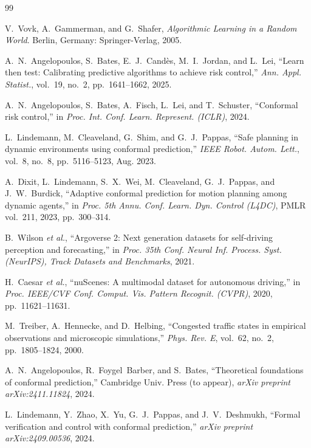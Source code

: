 \documentclass[lettersize,journal]{IEEEtran}
\begin{document}
\begin{thebibliography}{99}

V.~Vovk, A.~Gammerman, and G.~Shafer, \emph{Algorithmic Learning in a
Random World}. Berlin, Germany: Springer-Verlag, 2005.

A.~N.~Angelopoulos, S.~Bates, E.~J.~Cand\`es, M.~I.~Jordan, and L.~Lei,
``Learn then test: Calibrating predictive algorithms to achieve risk
control,'' \emph{Ann. Appl. Statist.}, vol.~19, no.~2, pp.~1641--1662,
2025.

A.~N.~Angelopoulos, S.~Bates, A.~Fisch, L.~Lei, and T.~Schuster,
``Conformal risk control,'' in \emph{Proc. Int. Conf. Learn.
Represent. (ICLR)}, 2024.

L.~Lindemann, M.~Cleaveland, G.~Shim, and G.~J.~Pappas, ``Safe planning
in dynamic environments using conformal prediction,'' \emph{IEEE Robot.
Autom. Lett.}, vol.~8, no.~8, pp.~5116--5123, Aug. 2023.

A.~Dixit, L.~Lindemann, S.~X.~Wei, M.~Cleaveland, G.~J.~Pappas, and
J.~W.~Burdick, ``Adaptive conformal prediction for motion planning
among dynamic agents,'' in \emph{Proc. 5th Annu. Conf. Learn. Dyn.
Control (L4DC)}, PMLR vol.~211, 2023, pp.~300--314.

B.~Wilson \emph{et al.}, ``Argoverse 2: Next generation datasets for
self-driving perception and forecasting,'' in \emph{Proc. 35th Conf.
Neural Inf. Process. Syst. (NeurIPS), Track Datasets and Benchmarks},
2021.

H.~Caesar \emph{et al.}, ``nuScenes: A multimodal dataset for autonomous
driving,'' in \emph{Proc. IEEE/CVF Conf. Comput. Vis. Pattern Recognit.
(CVPR)}, 2020, pp.~11621--11631.

M.~Treiber, A.~Hennecke, and D.~Helbing, ``Congested traffic states in
empirical observations and microscopic simulations,'' \emph{Phys. Rev.
E}, vol.~62, no.~2, pp.~1805--1824, 2000.

A.~N.~Angelopoulos, R.~Foygel~Barber, and S.~Bates, ``Theoretical
foundations of conformal prediction,'' Cambridge Univ. Press (to appear),
\emph{arXiv preprint arXiv:2411.11824}, 2024.

L.~Lindemann, Y.~Zhao, X.~Yu, G.~J.~Pappas, and J.~V.~Deshmukh,
``Formal verification and control with conformal prediction,''
\emph{arXiv preprint arXiv:2409.00536}, 2024.


\end{thebibliography}
\end{document}
